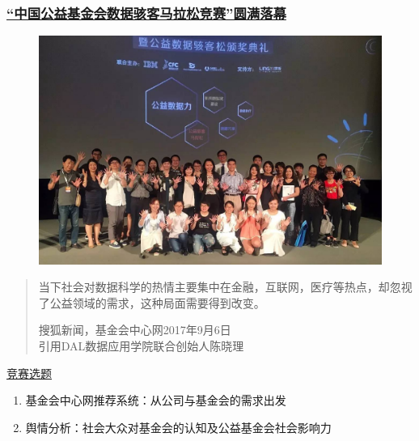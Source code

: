 \documentclass{ctexbeamer}
\begin{document}
\begin{frame}%
\frametitle{\href{http://www.sohu.com/a/190256051_247771}{“中国公益基金会数据骇客马拉松竞赛”圆满落幕 }}
\begin{figure}
\includegraphics[width=\textwidth]{background2.jpeg}
\end{figure}
\end{frame}
\begin{frame}
\begin{quote}
当下社会对数据科学的热情主要集中在金融，互联网，医疗等热点，却忽视了公益领域的需求，这种局面需要得到改变。
\begin{flushright}
搜狐新闻，基金会中心网2017年9月6日\\
引用DAL数据应用学院联合创始人陈晓理
\end{flushright}
\end{quote}
\begin{center}
\href{http://www.foundationcenter.org.cn/data_hackthrone/index.html}{竞赛选题}
\end{center}
\begin{enumerate}
\item 基金会中心网推荐系统：从公司与基金会的需求出发
\item 舆情分析：社会大众对基金会的认知及公益基金会社会影响力
\end{enumerate}
\end{frame}
\end{document}
